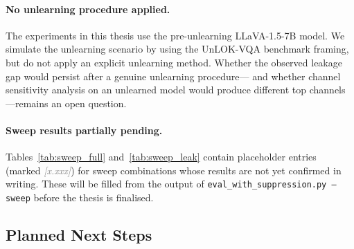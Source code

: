 \documentclass[12pt, a4paper]{article}
\newcommand{\placeholder}[1]{\textcolor{gray}{\textit{[#1]}}}
\begin{document}
\paragraph{No unlearning procedure applied.}
The experiments in this thesis use the pre-unlearning LLaVA-1.5-7B model.
We simulate the unlearning scenario by using the UnLOK-VQA benchmark framing, but do
not apply an explicit unlearning method.
Whether the observed leakage gap would persist after a genuine unlearning procedure---
and whether channel sensitivity analysis on an unlearned model would produce different
top channels---remains an open question.

\paragraph{Sweep results partially pending.}
Tables~\ref{tab:sweep_full} and~\ref{tab:sweep_leak} contain placeholder entries
(marked \placeholder{x.xxx}) for sweep combinations whose results are not yet
confirmed in writing.
These will be filled from the output of \texttt{eval\_with\_suppression.py --sweep}
before the thesis is finalised.

\subsection{Planned Next Steps}
\end{document}
